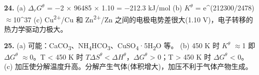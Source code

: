 \documentclass[a4paper,11pt]{ctexart}
\newcommand{\箭}{\ensuremath{\rightarrow}}
\newcommand{\左箭}{\ensuremath{\leftarrow}}
\newcommand{\上箭}{\ensuremath{\uparrow}}
\newcommand{\下箭}{\ensuremath{\downarrow}}
\newcommand{\衡}{\ensuremath{\rightleftharpoons}}
\newcommand{\双箭}{\ensuremath{\leftrightarrow}}
\newcommand{\约等于}{\ensuremath{\approx}}
\newcommand{\小于等于}{\ensuremath{\leq}}
\newcommand{\大于等于}{\ensuremath{\geq}}
\newcommand{\不等于}{\ensuremath{\neq}}
\newcommand{\西格马}{\ensuremath{\sigma}}
\newcommand{\派}{\ensuremath{\pi}}
\begin{document}
\textbf{24.}
(a) \(\Delta_r G^\theta\) = −2 × 96485 × 1.10 = −212.3 kJ/mol
(b) \(K^\theta\) = e\^{}(212300/2478) \约等于 10\^{}37
(c) Cu\textsuperscript{2+}/Cu 和 Zn\textsuperscript{2+}/Zn 之间的电极电势差很大(1.10 V)，电子转移的热力学驱动力极大。

\textbf{25.}
(a) 可能：CaCO\textsubscript{3}、NH\textsubscript{4}HCO\textsubscript{3}、CuSO\textsubscript{4}·5H\textsubscript{2}O 等。
(b) 450 K 时 \(K^\theta\) \约等于 1 即 \(\Delta G^\theta\) \约等于 0。T \textless{} 450 K 时 \(T\Delta S^\theta < \Delta H^\theta\)，\(\Delta G^\theta\) \textgreater{} 0；T \textgreater{} 450 K 时 \(\Delta G^\theta\) \textless{} 0。
(c) 加压使分解温度升高。分解产生气体(体积增大)，加压不利于气体产物生成。
\end{document}

